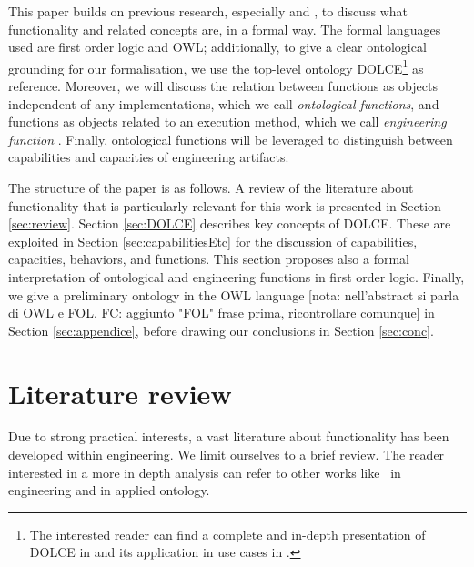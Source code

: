 \documentclass[sw]{iosart2x}
\newcommand{\DOLCE}{\textsc{DOLCE}\xspace} %
\newcommand{\OWL}{\textnormal{OWL}\xspace}
\newcommand{\firstTimeKeyWord}[1]{\textit{#1}}
\newcommand{\TODO}[1]{{\color{red} #1}}
\begin{document}
This paper builds on previous research, especially \cite{borgoCapabilitiesCapacitiesFunctionalities2021} and \cite{mizoguchiUnifyingDefinitionArtifact2016}, to discuss what functionality and related concepts are, in a formal way. 
The formal languages used are first order logic and \OWL; additionally, to give a clear ontological grounding for our formalisation, we use the top-level ontology \DOLCE\footnote{The interested reader can find a complete and in-depth presentation of \DOLCE in \cite{masoloWonderWebDeliverableD182003} and its application in use cases in \cite{borgoDOLCEDescriptiveOntology2022}.} as reference. 
Moreover, we will discuss the relation between functions as objects independent of any implementations, which we call \firstTimeKeyWord{ontological functions}, and functions as objects related to an execution method, which we call \firstTimeKeyWord{engineering function}%
.
Finally, ontological functions will be leveraged to  distinguish between capabilities and capacities of engineering artifacts.   

The structure of the paper is as follows. A review of the literature about functionality that is particularly relevant for this work is presented in Section \ref{sec:review}. 
Section \ref{sec:DOLCE} describes key concepts of \DOLCE. These are exploited in Section \ref{sec:capabilitiesEtc} for the discussion of capabilities, capacities, behaviors, and functions. This section proposes also a formal interpretation of ontological and engineering functions in first order logic. 
Finally, we give a preliminary ontology in the \OWL language\TODO{[nota: nell'abstract si parla di OWL e FOL. FC: aggiunto "FOL" frase prima, ricontrollare comunque]} in Section \ref{sec:appendice}, before drawing our conclusions in Section \ref{sec:conc}. 

\section{Literature review\label{sec:review}}%
Due to strong practical interests, a vast literature about functionality has been developed within engineering. 
We limit ourselves to a brief review. The reader interested in a more in depth analysis can refer to other works like~\cite{erdenReviewFunctionModeling2008} in engineering and \cite{artigaNewPerspectiveOnFunctions} in applied ontology.
\end{document}
